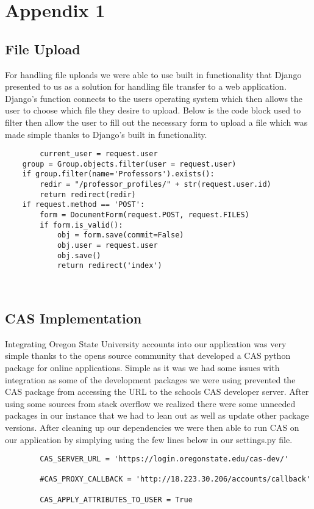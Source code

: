 \section{Appendix 1}
\subsection{File Upload}
\noindent For handling file uploads we were able to use built in functionality that Django presented to us as a solution for handling file transfer to a web application. Django's function connects to the users operating system which then allows the user to choose which file they desire to upload. Below is the code block used to filter then allow the user to fill out the necessary form to upload a file which was made simple thanks to Django's built in functionality.\\ 
    \begin{lstlisting}
        current_user = request.user
    group = Group.objects.filter(user = request.user)
    if group.filter(name='Professors').exists():
        redir = "/professor_profiles/" + str(request.user.id)
        return redirect(redir)
    if request.method == 'POST':
        form = DocumentForm(request.POST, request.FILES)
        if form.is_valid():
            obj = form.save(commit=False)
            obj.user = request.user
            obj.save()
            return redirect('index')
    \end{lstlisting} \\
    
\subsection{CAS Implementation}
\noindent Integrating Oregon State University accounts into our application was very simple thanks to the opens source community that developed a CAS python package for online applications. Simple as it was we had some issues with integration as some of the development packages we were using prevented the CAS package from accessing the URL to the schools CAS developer server. After using some sources from stack overflow we realized there were some unneeded packages in our instance that we had to lean out as well as update other package versions. After cleaning up our dependencies we were then able to run CAS on our application by simplying using the few lines below in our settings.py file. 
        \begin{lstlisting}
        CAS_SERVER_URL = 'https://login.oregonstate.edu/cas-dev/'

        #CAS_PROXY_CALLBACK = 'http://18.223.30.206/accounts/callback'

        CAS_APPLY_ATTRIBUTES_TO_USER = True
        \end{lstlisting}
    
